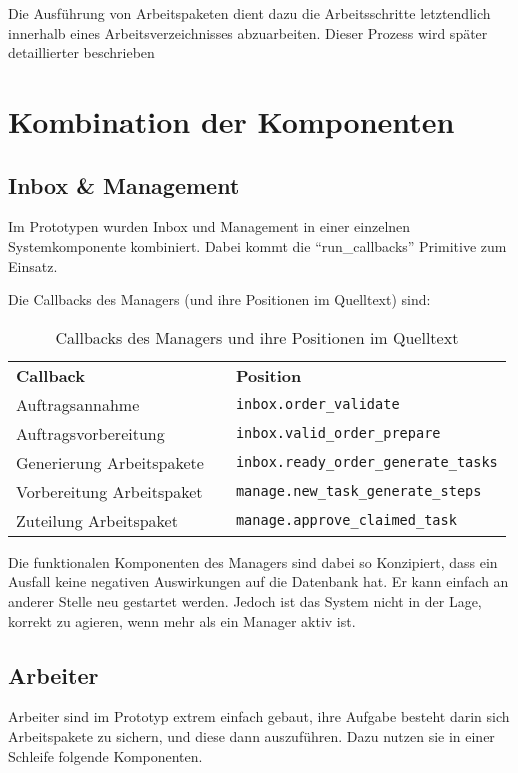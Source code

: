 Die Ausführung von Arbeitspaketen dient dazu die Arbeitsschritte letztendlich innerhalb eines Arbeitsverzeichnisses abzuarbeiten.
Dieser Prozess wird später detaillierter beschrieben


\section{Kombination der Komponenten}
\subsection{Inbox \& Management}

Im Prototypen wurden Inbox und Management in einer einzelnen Systemkomponente  kombiniert.
Dabei kommt die ``run\_callbacks'' Primitive zum Einsatz.

Die Callbacks des Managers (und ihre Positionen im Quelltext) sind:
\begin{table}
\begin{tabular}{lcl}
    \textbf{Callback} && \textbf{Position} \\
    Auftragsannahme && \verb|inbox.order_validate| \\
    Auftragsvorbereitung && \verb|inbox.valid_order_prepare| \\
    Generierung Arbeitspakete && \verb|inbox.ready_order_generate_tasks| \\
    Vorbereitung Arbeitspaket && \verb|manage.new_task_generate_steps| \\
    Zuteilung Arbeitspaket && \verb|manage.approve_claimed_task| \\
\end{tabular}
\caption{Callbacks des Managers und ihre Positionen im Quelltext}
\label{tab:callbacks-manager}
\end{table}

Die funktionalen Komponenten des Managers sind dabei so Konzipiert,
dass ein Ausfall keine negativen Auswirkungen auf die Datenbank hat.
Er kann einfach an anderer Stelle neu gestartet werden.
Jedoch ist das System nicht in der Lage, korrekt zu agieren, wenn mehr als ein Manager aktiv ist.
\subsection{Arbeiter}

Arbeiter sind im Prototyp extrem einfach gebaut,
ihre Aufgabe besteht darin sich Arbeitspakete zu sichern,
und diese dann auszuführen.
Dazu nutzen sie in einer Schleife folgende Komponenten.


